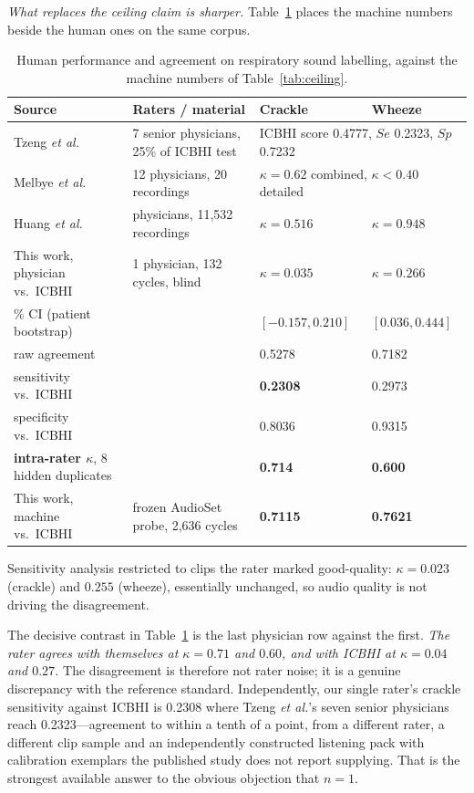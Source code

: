 \documentclass[journal,onecolumn]{IEEEtran}
\newcommand{\best}[1]{\textbf{#1}}
\begin{document}
\emph{What replaces the ceiling claim is sharper.} Table~\ref{tab:human} places the
machine numbers beside the human ones on the same corpus.

\begin{table}[!t]
\centering
\caption{Human performance and agreement on respiratory sound labelling, against
the machine numbers of Table~\ref{tab:ceiling}.}
\label{tab:human}
\small
\begin{tabular}{llll}
\toprule
Source & Raters / material & Crackle & Wheeze \\
\midrule
Tzeng \emph{et al.}~\cite{tzeng2025jmir} & 7 senior physicians, 25\% of ICBHI test & \multicolumn{2}{l}{ICBHI score 0.4777, $Se$ 0.2323, $Sp$ 0.7232} \\
Melbye \emph{et al.}~\cite{melbye2016kappa} & 12 physicians, 20 recordings & \multicolumn{2}{l}{$\kappa=0.62$ combined, $\kappa<0.40$ detailed} \\
Huang \emph{et al.}~\cite{huang2024crackles} & physicians, 11{,}532 recordings & $\kappa=0.516$ & $\kappa=0.948$ \\
\midrule
This work, physician vs.\ ICBHI & 1 physician, 132 cycles, blind & $\kappa=0.035$ & $\kappa=0.266$ \\
\quad 95\% CI (patient bootstrap) & & $[-0.157, 0.210]$ & $[0.036, 0.444]$ \\
\quad raw agreement & & 0.5278 & 0.7182 \\
\quad sensitivity vs.\ ICBHI & & \best{0.2308} & 0.2973 \\
\quad specificity vs.\ ICBHI & & 0.8036 & 0.9315 \\
\quad \best{intra-rater $\kappa$}, 8 hidden duplicates & & \best{0.714} & \best{0.600} \\
\midrule
This work, machine vs.\ ICBHI & frozen AudioSet probe, 2{,}636 cycles & \best{0.7115} & \best{0.7621} \\
\bottomrule
\end{tabular}

\vspace{2pt}
\footnotesize Sensitivity analysis restricted to clips the rater marked
good-quality: $\kappa = 0.023$ (crackle) and $0.255$ (wheeze), essentially
unchanged, so audio quality is not driving the disagreement.
\end{table}

The decisive contrast in Table~\ref{tab:human} is the last physician row against
the first. \emph{The rater agrees with themselves at $\kappa=0.71$ and $0.60$, and
with ICBHI at $\kappa=0.04$ and $0.27$.} The disagreement is therefore not rater
noise; it is a genuine discrepancy with the reference standard. Independently, our
single rater's crackle sensitivity against ICBHI is 0.2308 where Tzeng
\emph{et al.}'s seven senior physicians reach 0.2323---agreement to within a tenth
of a point, from a different rater, a different clip sample and an independently
constructed listening pack with calibration exemplars the published study does not
report supplying. That is the strongest available answer to the obvious objection
that $n=1$.
\end{document}
